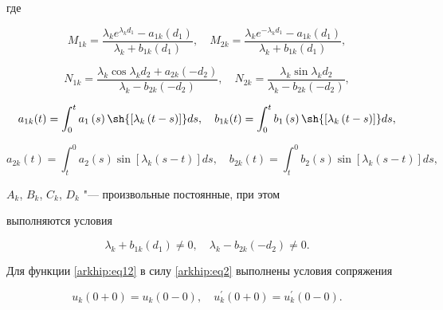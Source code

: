 где

\[M_{1 k} = \frac{\lambda_{k}e^{\lambda_{k} d_{1}} - a_{1k} \left(d_{1}\right)}{\lambda_{k} + b_{1 k} \left(d_{1}\right)},\quad 

M_{2 k} = \frac{\lambda_{k}e^{-\lambda_{k} d_{1}} - a_{1k} \left(d_{1}\right)}{\lambda_{k} + b_{1 k} \left(d_{1}\right)},\]

\[N_{1 k} = \frac{\lambda_{k}\cos {\lambda_{k} d_{2}} + a_{2k} \left({-d_{2}}\right)}{\lambda_{k} - b_{2k} \left({-d_{2}}\right)}, \quad

N_{2 k} = \frac{\lambda_{k}\sin{\lambda_{k} d_{2}}}{\lambda_{k} - b_{2k} \left({-d_{2}}\right)},

\]

$$a_{1k} (t) = \int_0^{t} a_{1}\left( {s}\right)

\sh {\left[ {\lambda_{k} \left({t - s}\right)}\right]}ds, \quad

b_{1k}(t) = \int_0^{t} b_{1}\left({s}\right)\sh

{\left[ {\lambda_{k} \left({t-s}\right)}\right]}ds,$$

$$a_{2k} (t) = \int_t^0 a_{2}\left( {s}\right)

\sin {\left[ {\lambda_{k} \left({s - t}\right)}\right]}ds, \quad

b_{2k}(t) = \int_t^{0} b_{2}\left(

{s}\right)\sin {\left[ {\lambda_{k} \left({s-t}\right)}\right]}ds,$$

$A_{k}$, $B_{k}$, $C_{k}$, $D_{k}$ "--- произвольные постоянные, при этом

выполняются условия

\begin{equation} \label{arkhip:eq13}

\lambda_{k}+b_{1k}\left({d_{1}}\right) \ne 0, \quad 

\lambda_{k}-b_{2k}\left({-d_{2}}\right) \ne 0.

\end{equation}

Для функции \eqref{arkhip:eq12} в силу \eqref{arkhip:eq2}  выполнены условия сопряжения

\begin{equation} \label{arkhip:eq14}

u_{k}\left({0 + 0}\right) = u_{k}\left({0 - 0}\right), \quad 

u_{k}^{\prime}\left( {0 + 0}\right) = u_{k}^{\prime}\left( {0 -

0}\right).

\end{equation}

